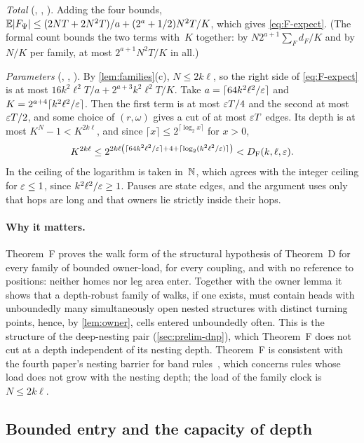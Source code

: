 \begin{outline}
\emph{Total} (, , ). Adding the four bounds,
$\mathbb E\lvert F_\Psi \rvert\le(2NT+2N^2T)/a+(2^a+1/2)N^2T/K$, which gives \eqref{eq:F-expect}. (The formal count bounds the two
terms with~$K$ together: by $N2^{a+1}\sum_Fd_F/K$ and by $N/K$ per family, at most $2^{a+1}N^2T/K$ in all.)

\emph{Parameters} (, , ). By \cref{lem:families}(c), $N\le2k\ell$,
so the right side of \eqref{eq:F-expect} is at most $16k^2\ell^2T/a+2^{a+3}k^2\ell^2T/K$. Take
$a=\lceil64k^2\ell^2/\varepsilon\rceil$ and $K=2^{a+4}\lceil k^2\ell^2/\varepsilon\rceil$.
Then the first term is at most $\varepsilon T/4$ and the second at most $\varepsilon T/2$, and some choice of $(r,\omega)$ gives a cut of
at most $\varepsilon T$ edges. Its depth is at most $K^N-1<K^{2k\ell}$, and since $\lceil x\rceil\le2^{\lceil\log_2x\rceil}$
for $x>0$,
\[
  K^{2k\ell}\le2^{2k\ell\left(\lceil64k^2\ell^2/\varepsilon\rceil+4+\lceil\log_2(k^2\ell^2/\varepsilon)\rceil\right)}<D_{\mathrm F}(k,\ell,\varepsilon).
\]
In  the ceiling of the logarithm is taken in~$\mathbb{N}$, which agrees with the integer ceiling for $\varepsilon\le1$, since
$k^2\ell^2/\varepsilon\ge1$. Pauses are state edges, and the argument uses only that hops are long and that owners lie strictly
inside their hops.
\end{outline}

\paragraph{Why it matters.} Theorem~F proves the walk form of the structural hypothesis of Theorem~D for every family of
bounded owner-load, for every coupling, and with no reference to positions: neither homes nor leg area enter. Together
with the owner lemma it shows that a depth-robust family of walks, if one exists, must contain heads with unboundedly
many simultaneously open nested structures with distinct turning points, hence, by \cref{lem:owner}, cells entered
unboundedly often. This is the structure of the deep-nesting pair (\cref{sec:prelim-dnp}), which Theorem~F does not
cut at a depth independent of its nesting depth. Theorem~F is consistent with the fourth paper's nesting barrier for band
rules~\cite[Remarks~5.6 and~5.7]{FourthPaper2026}, which concerns rules whose load does not grow with the nesting depth;
the load of the family clock is $N\le2k\ell$.

\subsection{Bounded entry and the capacity of depth}\label{sec:nest-capacity}

